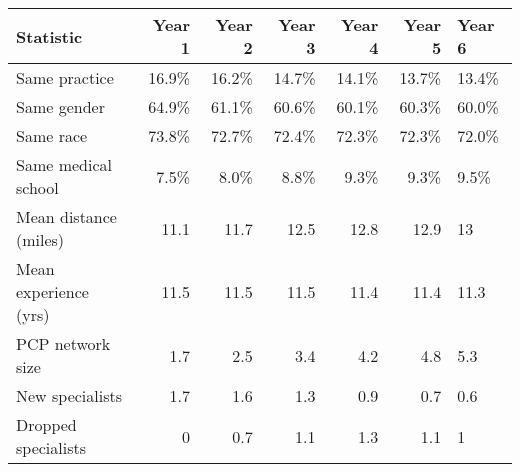\begin{table}[!h]
\centering
\begin{tabular}{lrrrrrl}
\toprule
Statistic & Year 1 & Year 2 & Year 3 & Year 4 & Year 5 & Year 6\\
\midrule
Same practice & 16.9\% & 16.2\% & 14.7\% & 14.1\% & 13.7\% & 13.4\%\\
Same gender & 64.9\% & 61.1\% & 60.6\% & 60.1\% & 60.3\% & 60.0\%\\
Same race & 73.8\% & 72.7\% & 72.4\% & 72.3\% & 72.3\% & 72.0\%\\
Same medical school & 7.5\% & 8.0\% & 8.8\% & 9.3\% & 9.3\% & 9.5\%\\
Mean distance (miles) & 11.1 & 11.7 & 12.5 & 12.8 & 12.9 & 13\\
\addlinespace
Mean experience (yrs) & 11.5 & 11.5 & 11.5 & 11.4 & 11.4 & 11.3\\
PCP network size & 1.7 & 2.5 & 3.4 & 4.2 & 4.8 & 5.3\\
New specialists & 1.7 & 1.6 & 1.3 & 0.9 & 0.7 & 0.6\\
Dropped specialists & 0 & 0.7 & 1.1 & 1.3 & 1.1 & 1\\
\bottomrule
\end{tabular}
\end{table}
